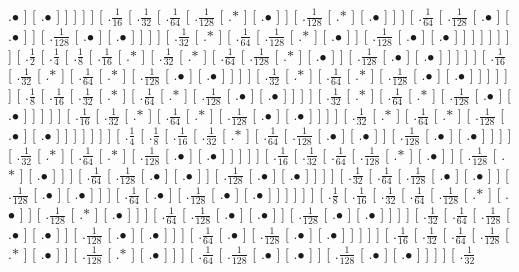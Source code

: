 \documentclass[a4paper,10pt]{article}
\begin{document}
\begin{landscape}
{.$\bullet$ ]  [ .$\bullet$ ]  ]  ]  ]  ]  [ .$\frac{1}{16}$  [ .$\frac{1}{32}$  [ .$\frac{1}{64}$  [ .$\frac{1}{128}$  [ .$*$ ]  [ .$\bullet$ ]  ]  [ .$\frac{1}{128}$  [ .$*$ ]  [ .$\bullet$ ]  ]  ]  [ .$\frac{1}{64}$  [ .$\frac{1}{128}$  [ .$\bullet$ ]  [ .$\bullet$ ]  ]  [ .$\frac{1}{128}$  [ .$\bullet$ ]  [ .$\bullet$ ]  ]  ]  ]  [ .$\frac{1}{32}$  [ .$*$ ]  [ .$\frac{1}{64}$  [ .$\frac{1}{128}$  [ .$*$ ]  [ .$\bullet$ ]  ]  [ .$\frac{1}{128}$  [ .$\bullet$ ]  [ .$\bullet$ ]  ]  ]  ]  ]  ]  ]  ]  [ .$\frac{1}{2}$  [ .$\frac{1}{4}$  [ .$\frac{1}{8}$  [ .$\frac{1}{16}$  [ .$*$ ]  [ .$\frac{1}{32}$  [ .$*$ ]  [ .$\frac{1}{64}$  [ .$\frac{1}{128}$  [ .$*$ ]  [ .$\bullet$ ]  ]  [ .$\frac{1}{128}$  [ .$\bullet$ ]  [ .$\bullet$ ]  ]  ]  ]  ]  [ .$\frac{1}{16}$  [ .$\frac{1}{32}$  [ .$*$ ]  [ .$\frac{1}{64}$  [ .$*$ ]  [ .$\frac{1}{128}$  [ .$\bullet$ ]  [ .$\bullet$ ]  ]  ]  ]  [ .$\frac{1}{32}$  [ .$*$ ]  [ .$\frac{1}{64}$  [ .$*$ ]  [ .$\frac{1}{128}$  [ .$\bullet$ ]  [ .$\bullet$ ]  ]  ]  ]  ]  ]  [ .$\frac{1}{8}$  [ .$\frac{1}{16}$  [ .$\frac{1}{32}$  [ .$*$ ]  [ .$\frac{1}{64}$  [ .$*$ ]  [ .$\frac{1}{128}$  [ .$\bullet$ ]  [ .$\bullet$ ]  ]  ]  ]  [ .$\frac{1}{32}$  [ .$*$ ]  [ .$\frac{1}{64}$  [ .$*$ ]  [ .$\frac{1}{128}$  [ .$\bullet$ ]  [ .$\bullet$ ]  ]  ]  ]  ]  [ .$\frac{1}{16}$  [ .$\frac{1}{32}$  [ .$*$ ]  [ .$\frac{1}{64}$  [ .$*$ ]  [ .$\frac{1}{128}$  [ .$\bullet$ ]  [ .$\bullet$ ]  ]  ]  ]  [ .$\frac{1}{32}$  [ .$*$ ]  [ .$\frac{1}{64}$  [ .$*$ ]  [ .$\frac{1}{128}$  [ .$\bullet$ ]  [ .$\bullet$ ]  ]  ]  ]  ]  ]  ]  [ .$\frac{1}{4}$  [ .$\frac{1}{8}$  [ .$\frac{1}{16}$  [ .$\frac{1}{32}$  [ .$*$ ]  [ .$\frac{1}{64}$  [ .$\frac{1}{128}$  [ .$\bullet$ ]  [ .$\bullet$ ]  ]  [ .$\frac{1}{128}$  [ .$\bullet$ ]  [ .$\bullet$ ]  ]  ]  ]  [ .$\frac{1}{32}$  [ .$*$ ]  [ .$\frac{1}{64}$  [ .$*$ ]  [ .$\frac{1}{128}$  [ .$\bullet$ ]  [ .$\bullet$ ]  ]  ]  ]  ]  [ .$\frac{1}{16}$  [ .$\frac{1}{32}$  [ .$\frac{1}{64}$  [ .$\frac{1}{128}$  [ .$*$ ]  [ .$\bullet$ ]  ]  [ .$\frac{1}{128}$  [ .$*$ ]  [ .$\bullet$ ]  ]  ]  [ .$\frac{1}{64}$  [ .$\frac{1}{128}$  [ .$\bullet$ ]  [ .$\bullet$ ]  ]  [ .$\frac{1}{128}$  [ .$\bullet$ ]  [ .$\bullet$ ]  ]  ]  ]  [ .$\frac{1}{32}$  [ .$\frac{1}{64}$  [ .$\frac{1}{128}$  [ .$\bullet$ ]  [ .$\bullet$ ]  ]  [ .$\frac{1}{128}$  [ .$\bullet$ ]  [ .$\bullet$ ]  ]  ]  [ .$\frac{1}{64}$  [ .$\bullet$ ]  [ .$\frac{1}{128}$  [ .$\bullet$ ]  [ .$\bullet$ ]  ]  ]  ]  ]  ]  [ .$\frac{1}{8}$  [ .$\frac{1}{16}$  [ .$\frac{1}{32}$  [ .$\frac{1}{64}$  [ .$\frac{1}{128}$  [ .$*$ ]  [ .$\bullet$ ]  ]  [ .$\frac{1}{128}$  [ .$*$ ]  [ .$\bullet$ ]  ]  ]  [ .$\frac{1}{64}$  [ .$\frac{1}{128}$  [ .$\bullet$ ]  [ .$\bullet$ ]  ]  [ .$\frac{1}{128}$  [ .$\bullet$ ]  [ .$\bullet$ ]  ]  ]  ]  [ .$\frac{1}{32}$  [ .$\frac{1}{64}$  [ .$\frac{1}{128}$  [ .$\bullet$ ]  [ .$\bullet$ ]  ]  [ .$\frac{1}{128}$  [ .$\bullet$ ]  [ .$\bullet$ ]  ]  ]  [ .$\frac{1}{64}$  [ .$\bullet$ ]  [ .$\frac{1}{128}$  [ .$\bullet$ ]  [ .$\bullet$ ]  ]  ]  ]  ]  [ .$\frac{1}{16}$  [ .$\frac{1}{32}$  [ .$\frac{1}{64}$  [ .$\frac{1}{128}$  [ .$*$ ]  [ .$\bullet$ ]  ]  [ .$\frac{1}{128}$  [ .$*$ ]  [ .$\bullet$ ]  ]  ]  [ .$\frac{1}{64}$  [ .$\frac{1}{128}$  [ .$\bullet$ ]  [ .$\bullet$ ]  ]  [ .$\frac{1}{128}$  [ .$\bullet$ ]  [ .$\bullet$ ]  ]  ]  ]  [ .$\frac{1}{32}$  }
\end{landscape}
\end{document}
